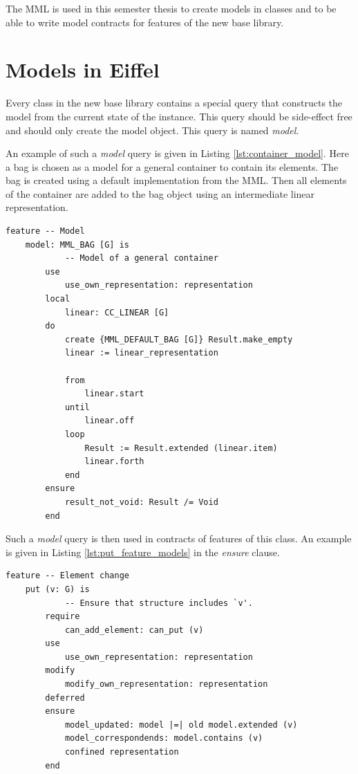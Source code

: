 The MML is used in this semester thesis to create models in classes and to be able to write model contracts for features of the new base library.

\section{Models in Eiffel}
\label{sec:ModelsInEiffel}

Every class in the new base library contains a special query that constructs the model from the current state of the instance. This query should be side-effect free and should only create the model object. This query is named \emph{model}.

An example of such a \emph{model} query is given in Listing \ref{lst:container_model}. Here a bag is chosen as a model for a general container to contain its elements. The bag is created using a default implementation from the MML. Then all elements of the container are added to the bag object using an intermediate linear representation.

\begin{lstlisting}[float,caption=model feature of the CC\_CONTAINER class.,label=lst:container_model]
feature -- Model
	model: MML_BAG [G] is
			-- Model of a general container
		use
			use_own_representation: representation
		local
			linear: CC_LINEAR [G]
		do
			create {MML_DEFAULT_BAG [G]} Result.make_empty
			linear := linear_representation

			from
				linear.start
			until
				linear.off
			loop
				Result := Result.extended (linear.item)
				linear.forth
			end
		ensure
			result_not_void: Result /= Void
		end
\end{lstlisting}

Such a \emph{model} query is then used in contracts of features of this class. An example is given in Listing \ref{lst:put_feature_models} in the \emph{ensure} clause. 

\begin{lstlisting}[float,caption=put feature of the CC\_COLLECTION class.,label=lst:put_feature_models]
feature -- Element change
	put (v: G) is
			-- Ensure that structure includes `v'.
		require
			can_add_element: can_put (v)
		use
			use_own_representation: representation
		modify
			modify_own_representation: representation
		deferred
		ensure
			model_updated: model |=| old model.extended (v)
			model_correspondends: model.contains (v)
			confined representation
		end
\end{lstlisting}

